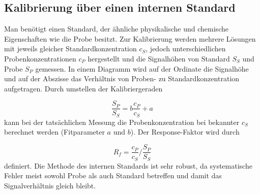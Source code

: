   \subsection{Kalibrierung über einen internen Standard}
  
    Man benötigt einen Standard, der ähnliche physikalische und chemische Eigenschaften wie die Probe besitzt. Zur Kalibrierung werden mehrere Lösungen mit jeweils gleicher Standardkonzentration $c_{S}$, jedoch unterschiedlichen Probenkonzentrationen $c_{P}$ hergestellt und die Signalhöhen von Standard $S_{S}$ und Probe $S_{P}$ gemessen. In einem Diagramm wird auf der Ordinate die Signalhöhe und auf der Abszisse das Verhältnis von Proben- zu Standardkonzentration aufgetragen. Durch umstellen der Kalibriergeraden 
    
      \begin{equation}
        \frac{S_{P}}{S_{S}} = b \frac{c_{P}}{c_{S}} + a
      \end{equation}
    kann bei der tatsächlichen Messung die Probenkonzentration bei bekannter $c_S$ berechnet werden (Fitparameter $a$ und $b$). Der Response-Faktor wird durch
    
      \begin{equation}
        R_f = \frac{c_{P}}{c_{S}} / \frac{S_{P}}{S_{S}}
      \end{equation}
    definiert. Die Methode des internen Standards ist sehr robust, da systematische Fehler meist sowohl Probe als auch Standard betreffen und damit das Signalverhältnis gleich bleibt. \citep{AnalytikIII} 
    
      